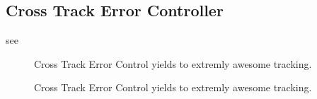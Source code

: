 \subsection{Cross Track Error Controller}
see \cite{williams}

\begin{figure}[h]
    \centering
    \def\svgwidth{0.5\columnwidth}
    
    \caption{Cross Track Error Control yields to extremly awesome tracking.}
    \label{fig:scene_crossTrack}
\end{figure}


\begin{figure}[h]
    \centering
    \def\svgwidth{\columnwidth}
    
    \caption{Cross Track Error Control yields to extremly awesome tracking.}
    \label{fig:crossTrack}
\end{figure}


%

